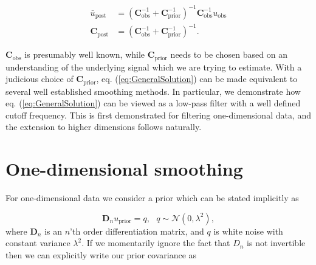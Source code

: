 \documentclass[10pt,a4paper]{article}
\begin{document}
\begin{equation}\label{eq:GeneralSolution}
\begin{split}
  \bar{u}_\mathrm{post} &= (\mathbf{C}_\mathrm{obs}^{-1} + 
                            \mathbf{C}_\mathrm{prior}^{-1})^{-1}
                            \mathbf{C}_\mathrm{obs}^{-1} u_\mathrm{obs}
\\
\mathbf{C}_\mathrm{post} &= (\mathbf{C}_\mathrm{obs}^{-1} + 
                             \mathbf{C}_\mathrm{prior}^{-1})^{-1}.                          
\end{split}
\end{equation}
 
$\mathbf{C}_\mathrm{obs}$ is presumably well known, while $\mathbf{C}_\mathrm{prior}$ needs to be chosen based on an understanding of the underlying signal which we are trying to estimate.  With a judicious choice of $\mathbf{C}_\mathrm{prior}$,  eq. (\ref{eq:GeneralSolution}) can be made equivalent to several well established smoothing methods.  In particular, we demonstrate how eq. (\ref{eq:GeneralSolution}) can be viewed as a low-pass filter with a well defined cutoff frequency. This is first demonstrated for filtering one-dimensional data, and the extension to higher dimensions follows naturally.  

\section*{One-dimensional smoothing}
For one-dimensional data we consider a prior which can be stated implicitly as

\begin{equation}\label{eq:ImplicitPrior1D}
  \mathbf{D}_{n} u_\mathrm{prior} = q, \ \ \ q \sim \mathcal{N}(0,\lambda^2),
\end{equation}  
where $\mathbf{D}_n$ is an $n$'th order differentiation matrix, and $q$ is white noise with constant variance $\lambda^2$.  If we momentarily ignore the fact that $D_n$ is not invertible then we can explicitly write our prior covariance as
\end{document}
